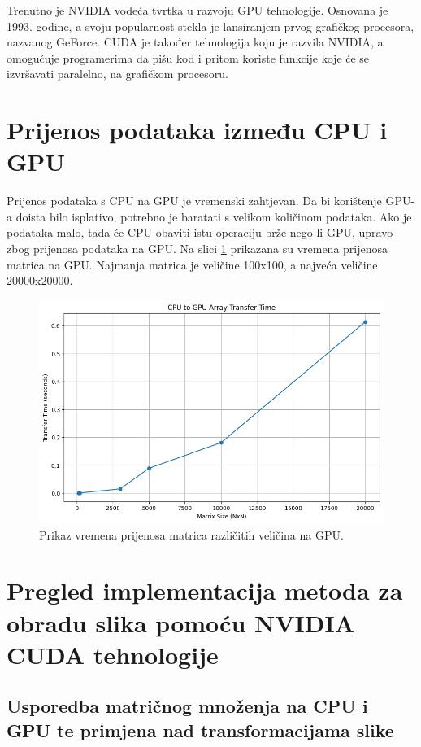 \documentclass[a4paper,twocolumn]{article}
\begin{document}
        Trenutno je NVIDIA vodeća tvrtka u razvoju GPU tehnologije. Osnovana je 1993. godine, a svoju popularnost stekla je lansiranjem prvog grafičkog procesora, nazvanog GeForce. CUDA je također tehnologija koju je razvila NVIDIA, a omogućuje programerima da pišu kod i pritom koriste funkcije koje će se izvršavati paralelno, na grafičkom procesoru.
        
        \section{Prijenos podataka između CPU i GPU}
        
        Prijenos podataka s CPU na GPU je vremenski zahtjevan. Da bi korištenje GPU-a doista bilo isplativo, potrebno je baratati s velikom količinom podataka. Ako je podataka malo, tada će CPU obaviti istu operaciju brže nego li GPU, upravo zbog prijenosa podataka na GPU. Na slici \ref{fig:data_to_gpu} prikazana su vremena prijenosa matrica na GPU. Najmanja matrica je veličine 100x100, a najveća veličine 20000x20000. 
        
        \begin{figure}[H]
        	\centering
        	\includegraphics[width=0.9\linewidth]{slike/data_to_gpu.png}
        	\caption{Prikaz vremena prijenosa matrica različitih veličina na GPU.}
        	\label{fig:data_to_gpu}
        \end{figure}
        
	\section{Pregled implementacija metoda za obradu slika pomoću NVIDIA CUDA tehnologije}
	
	\subsection{Usporedba matričnog množenja na CPU i GPU te primjena nad transformacijama slike}
	
\end{document}
